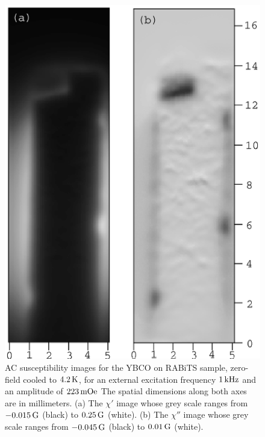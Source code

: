 %
%
\begin{figure}[p]
\includegraphics{figs/magpen/fig5r3a.ps}
\caption[YBCO on RABiTS AC susceptibility images at $1\,\kHz$.]
{AC susceptibility images for the YBCO on RABiTS sample, 
zero-field cooled to $4.2\,\kelvin$, 
for an external excitation frequency  
$1\,\kHz$ and
an amplitude of $223\,\mOe$
The spatial dimensions along both 
axes are in millimeters. 
(a) The $\chi'$ image whose grey scale ranges from
$-0.015\,\Gauss$ (black) to $0.25\,\Gauss$ (white).
(b) The $\chi''$ image whose grey scale ranges from  
$-0.045\,\Gauss$ (black) to $0.01\,\Gauss$ (white). 
}
\label{fig:rabits_ac_images_a}
\end{figure}

